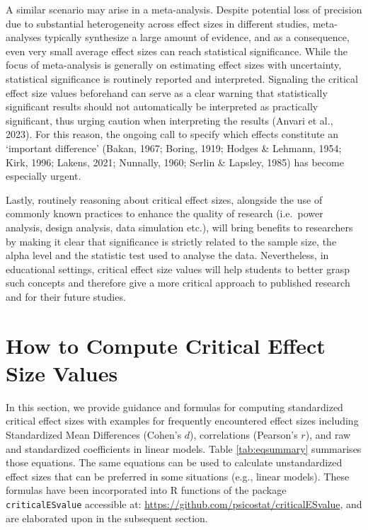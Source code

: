 \documentclass[
  man,floatsintext]{apa7}
\begin{document}
A similar scenario may arise in a meta-analysis. Despite potential loss of precision due to substantial heterogeneity across effect sizes in different studies, meta-analyses typically synthesize a large amount of evidence, and as a consequence, even very small average effect sizes can reach statistical significance. While the focus of meta-analysis is generally on estimating effect sizes with uncertainty, statistical significance is routinely reported and interpreted. Signaling the critical effect size values beforehand can serve as a clear warning that statistically significant results should not automatically be interpreted as practically significant, thus urging caution when interpreting the results (Anvari et al., 2023). For this reason, the ongoing call to specify which effects constitute an `important difference' (Bakan, 1967; Boring, 1919; Hodges \& Lehmann, 1954; Kirk, 1996; Lakens, 2021; Nunnally, 1960; Serlin \& Lapsley, 1985) has become especially urgent.

Lastly, routinely reasoning about critical effect sizes, alongside the use of commonly known practices to enhance the quality of research (i.e.~power analysis, design analysis, data simulation etc.), will bring benefits to researchers by making it clear that significance is strictly related to the sample size, the alpha level and the statistic test used to analyse the data. Nevertheless, in educational settings, critical effect size values will help students to better grasp such concepts and therefore give a more critical approach to published research and for their future studies.

\hypertarget{how-to-compute-critical-effect-size-values}{%
\section{How to Compute Critical Effect Size Values}\label{how-to-compute-critical-effect-size-values}}

In this section, we provide guidance and formulas for computing standardized critical effect sizes with examples for frequently encountered effect sizes including Standardized Mean Differences (Cohen's \(d\)), correlations (Pearson's \(r\)), and raw and standardized coefficients in linear models. Table \ref{tab:eqsummary} summarises those equations. The same equations can be used to calculate unstandardized effect sizes that can be preferred in some situations (e.g., linear models). These formulas have been incorporated into R functions of the package \texttt{criticalESvalue} accessible at: \url{https://github.com/psicostat/criticalESvalue}, and are elaborated upon in the subsequent section.
\end{document}
